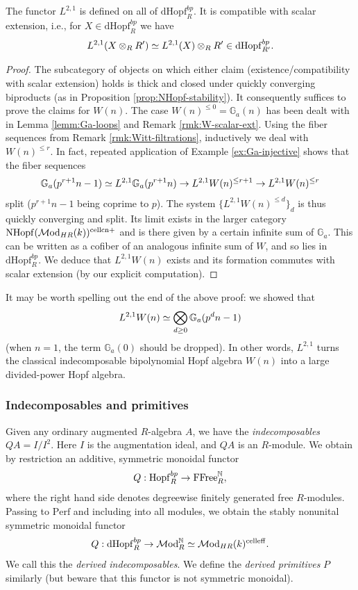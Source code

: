 \documentclass{amsart}
\numberwithin{proposition}{section}
\numberwithin{equation}{section}
\def\cell{\mathrm{cell}}
\def\NHopf{\mathrm{NHopf}}
\def\Hopf{\mathrm{Hopf}}
\def\dHopf{\mathrm{dHopf}}
\def\Hopf{\mathrm{Hopf}}
\def\cn{\mathrm{cn}}
\newcommand{\Ga}{{\mathbb{G}_a}}
\def\FFree{\mathrm{FFree}}
\def\Perf{\mathrm{Perf}}
\def\hLoops{L}
\begin{document}
\begin{proposition} \label{prop:alg-loops-defined}
The functor $\hLoops^{2,1}$ is defined on all of $\dHopf_R^{bp}$.
It is compatible with scalar extension, i.e., for $X \in \dHopf_R^{bp}$ we have \[ \hLoops^{2,1}(X \otimes_R R') \wequi \hLoops^{2,1}(X) \otimes_R R' \in \dHopf_{R'}^{bp}. \]
\end{proposition}
\begin{proof}
The subcategory of objects on which either claim (existence/compatibility with scalar extension) holds is thick and closed under quickly converging biproducts (as in Proposition \ref{prop:NHopf-stability}).
It consequently suffices to prove the claims for $W(n)$.
The case $W(n)^{\le 0} = \Ga(n)$ has been dealt with in Lemma \ref{lemm:Ga-loops} and Remark \ref{rmk:W-scalar-ext}.
Using the fiber sequences from Remark \ref{rmk:Witt-filtrations}, inductively we deal with $W(n)^{\le r}$.
In fact, repeated application of Example \ref{ex:Ga-injective} shows that the fiber sequences \[ \Ga(p^{r+1}n - 1) \wequi \hLoops^{2,1} \Ga(p^{r+1}n) \to \hLoops^{2,1} W(n)^{\le r+1} \to \hLoops^{2,1} W(n)^{\le r} \] split ($p^{r+1}n-1$ being coprime to $p$).
The system $\{\hLoops^{2,1}W(n)^{\le d}\}_d$ is thus quickly converging and split.
Its limit exists in the larger category $\NHopf(\Mod_{HR}(k))^{\cell\cn+}$ and is there given by a certain infinite sum of $\Ga$.
This can be written as a cofiber of an analogous infinite sum of $W$, and so lies in $\dHopf_R^{bp}$.
We deduce that $\hLoops^{2,1}W(n)$ exists and its formation commutes with scalar extension (by our explicit computation).
\end{proof}

\begin{remark}
It may be worth spelling out the end of the above proof: we showed that \[ \hLoops^{2,1}W(n) \wequi \bigotimes_{d \ge 0} \Ga(p^dn-1) \] (when $n=1$, the term $\Ga(0)$ should be dropped).
In other words, $\hLoops^{2,1}$ turns the classical indecomposable bipolynomial Hopf algebra $W(n)$ into a large divided-power Hopf algebra.
\end{remark}

\subsubsection{Indecomposables and primitives}
Given any ordinary augmented $R$-algebra $A$, we have the \emph{indecomposables} $QA = I/I^2$.
Here $I$ is the augmentation ideal, and $QA$ is an $R$-module.
We obtain by restriction an additive, symmetric monoidal functor \[ Q: \Hopf_R^{bp} \to \FFree_R^{\N}, \] where the right hand side denotes degreewise finitely generated free $R$-modules.
Passing to $\Perf$ and including into all modules, we obtain the stably nonunital symmetric monoidal functor \[ Q: \dHopf_R^{bp} \to \Mod_R^\N \wequi \Mod_{HR}(k)^{\cell\eff}. \]
We call this the \emph{derived indecomposables}.
We define the \emph{derived primitives} $P$ similarly (but beware that this functor is not symmetric monoidal).
\end{document}
